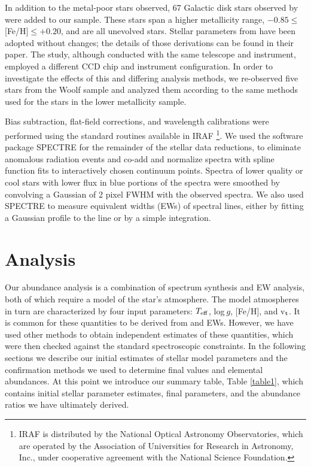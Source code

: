\documentclass[12pt,preprint]{aastex}
\def\teff{\mbox{$T_{\rm {eff}}$}}
\def\vt{\mbox{v$_{\rm t}$}}
\begin{document}
In addition to the metal-poor stars observed, 67 Galactic disk stars observed by \citet{Woolf1995} were added to our sample.  These stars span a higher metallicity range, $-0.85\leq$[Fe/H]$\leq+0.20$, and are all unevolved stars.  Stellar parameters from \citet{Woolf1995} have been adopted without changes; the details of those derivations can be found in their paper.  The \citet{Woolf1995} study, although conducted with the same telescope and instrument, employed a different CCD chip and instrument configuration.  In order to investigate the effects of this and differing analysis methods, we re-observed five stars from the Woolf sample and analyzed them according to the same methods used for the stars in the lower metallicity sample.

Bias subtraction, flat-field corrections, and wavelength calibrations were performed using the standard routines available in IRAF \footnote{IRAF is distributed by the National Optical Astronomy Observatories, which are  operated by the Association of Universities for Research in Astronomy, Inc., under cooperative agreement with the
National Science Foundation.}.  We used the software package SPECTRE \citep{Fitzpatrick1987} for the remainder of the stellar data reductions, to eliminate anomalous radiation events and
co-add and normalize spectra with spline function fits to interactively chosen continuum points.  Spectra of lower quality or cool stars with lower flux in blue portions of the spectra were smoothed by convolving a Gaussian of 2 pixel FWHM with the observed spectra.    We also used SPECTRE to measure equivalent widths (EWs) of spectral lines, either by fitting a Gaussian profile to the line or by a simple integration.

\section{Analysis \label{ana}}
Our abundance analysis is a combination of spectrum synthesis and EW analysis, both of which require a model of the star's atmosphere.  The model atmospheres in turn are characterized by four input parameters: \teff, log$~g$, [Fe/H], and \vt.  It is common for these quantities to be derived from  and  EWs.  However,  we have used other methods to obtain independent estimates of these quantities, which were then checked against the standard spectroscopic constraints.  In the following sections we describe our initial estimates of stellar model parameters and the confirmation methods we used to determine final values and elemental abundances.   At this point we introduce our summary table, Table \ref{table1}, which contains initial stellar parameter estimates, final parameters, and the abundance ratios we have  ultimately derived.
\end{document}
